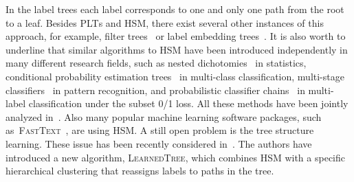 \documentclass{article}
\newcommand{\Algo}[1]{\textsc{#1}}
\begin{document}
In the label trees each label corresponds to one and only one path from the root to a leaf. 
Besides \Algo{PLT}s and \Algo{HSM}, there exist several other instances of this approach, 
for example, filter trees~\citep{Beygelzimer_et_al_2009a,Li_Lin_2014} 
or label embedding trees~\citep{Bengio_et_al_2010}. 
It is also worth to underline that similar algorithms to \Algo{HSM} 
have been introduced independently in many different research fields, 
such as nested dichotomies~\citep{Fox_1997} in statistics, 
conditional probability estimation trees~\citep{Beygelzimer_et_al_2009b} in multi-class classification, 
multi-stage classifiers~\citep{Kurzynski_1988} in pattern recognition, 
and probabilistic classifier chains~\citep{Dembczynski_et_al_2010c} in multi-label classification under the subset 0/1 loss. 
All these methods have been jointly analyzed in~\citep{Dembczynski_et_al_2016}.
Also many popular machine learning software packages, such as~\Algo{FastText}~\citep{Joulin_et_al_2016}, are using \Algo{HSM}.
A still open problem is the tree structure learning. 
These issue has been recently considered in~\citep{Jernite_et_al_2017}. %
The authors have introduced a new algorithm, \Algo{LearnedTree}, which combines \Algo{HSM} 
with a specific hierarchical clustering that reassigns labels to paths in the tree. 

%
\end{document}
